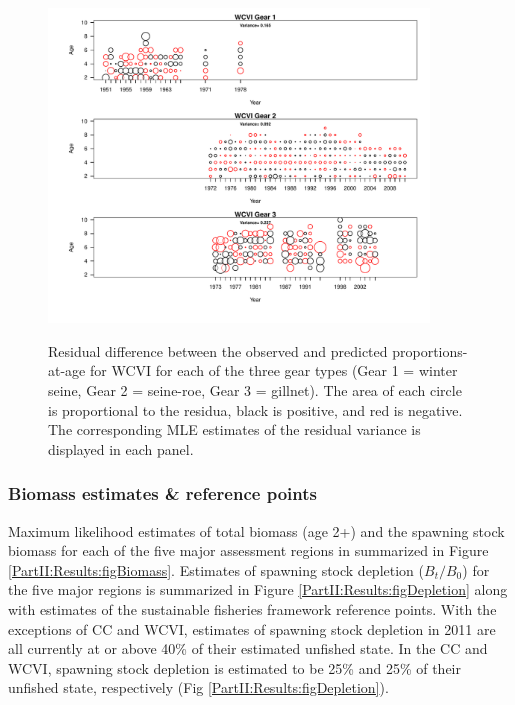 \begin{figure}
	\centering
	\includegraphics[width=0.9\textwidth]{../FIGS/qPriorFigs/iscam_fig_agecompsresid_WCVI.pdf}\\
	\caption{Residual difference between the observed and predicted proportions-at-age for WCVI for each of the three gear types (Gear 1 = winter seine, Gear 2 = seine-roe, Gear 3 = gillnet).  The area of each circle is proportional to the residua, black is positive, and red is negative.  The corresponding MLE estimates of the residual variance is displayed in each panel.}\label{PartII:Results:figAgeCompWCVI}
\end{figure}







\subsubsection{Biomass estimates \& reference points}

Maximum likelihood estimates of total biomass (age 2+) and the spawning stock biomass for each of the five major assessment regions in summarized in Figure \ref{PartII:Results:figBiomass}.  Estimates of spawning stock depletion ($B_t/B_0$) for the five major regions is summarized in Figure \ref{PartII:Results:figDepletion} along with estimates of the sustainable fisheries framework reference points.  With the exceptions of CC and WCVI, estimates of spawning stock depletion in 2011 are all currently at or above 40\% of their estimated unfished state. In the  CC and WCVI, spawning stock depletion is estimated to be  25\% and 25\% of their unfished state, respectively (Fig \ref{PartII:Results:figDepletion}).

